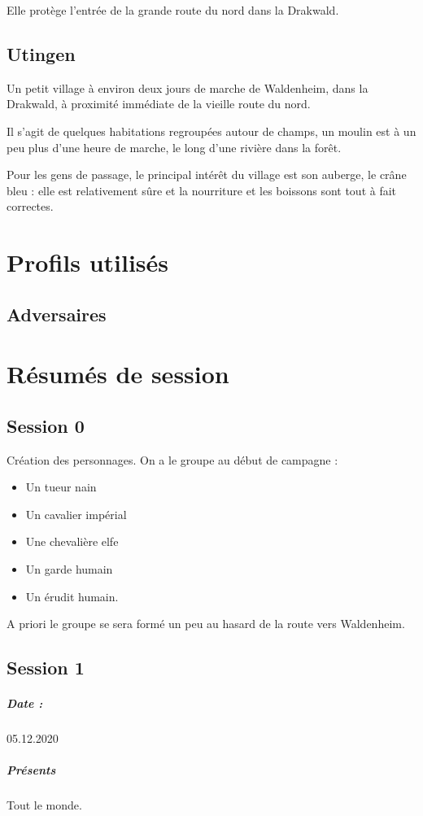\documentclass[10pt,a4paper]{book}
\begin{document}
Elle protège l'entrée de la grande route du nord dans la Drakwald.
\section{Utingen}
Un petit village à environ deux jours de marche de Waldenheim, dans la Drakwald, à proximité immédiate de la vieille route du nord. 

Il s'agit de quelques habitations regroupées autour de champs, un moulin est à un peu plus d'une heure de marche, le long d'une rivière dans la forêt. 

Pour les gens de passage, le principal intérêt du village est son auberge, le crâne bleu : elle est relativement sûre et la nourriture et les boissons sont tout à fait correctes.
\chapter{Profils utilisés}
\section{Adversaires}

\chapter{Résumés de session}
\section{Session 0}
Création des personnages. On a le groupe au début de campagne :
\begin{itemize}
\item Un tueur nain
\item Un cavalier impérial
\item Une chevalière elfe
\item Un garde humain
\item Un érudit humain.
\end{itemize}
A priori le groupe se sera formé un peu au hasard de la route vers Waldenheim.
\section{Session 1}
\paragraph{Date :}05.12.2020
\paragraph{Présents} Tout le monde.
\end{document}
